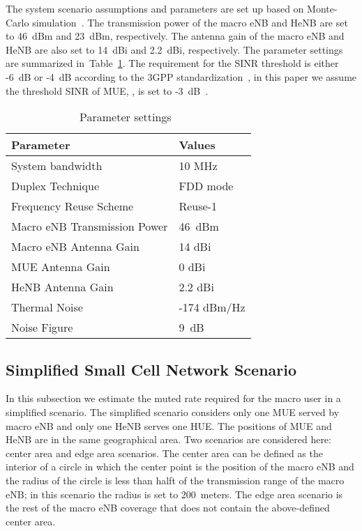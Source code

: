 \documentclass[paper]{ieice}
\begin{document}
The system scenario assumptions and parameters are set up based on Monte-Carlo simulation~\cite{TR-36942}. The transmission power of the  macro eNB and HeNB are set to 46~dBm and 23~dBm, respectively. The antenna gain of the macro eNB and HeNB are also set to 14~dBi and 2.2~dBi, respectively. The parameter settings are summarized in~Table~\ref{parameter}. The requirement for the SINR threshold is either -6~dB or -4~dB according to the 3GPP standardization~\cite{yang2011a}, in this paper we assume the threshold SINR of MUE, , is set to -3~dB~\cite{Kamel2012}.
\begin{table}[t]
\caption{Parameter settings~\cite{TR-36942}} \centering
\begin{tabular}{l l} \hline Parameter & Values \\ \hline System bandwidth                    & 10 MHz \\ Duplex Technique                    & FDD mode \\ Frequency Reuse Scheme              & Reuse-1 \\ Macro eNB Transmission Power             & 46~dBm\\ Macro eNB Antenna Gain                   & 14 dBi\\ MUE Antenna Gain                    & 0 dBi\\ HeNB Antenna Gain                   & 2.2 dBi\\ Thermal Noise                       & -174 dBm/Hz \\
Noise Figure                        & 9~dB  \\
\hline \end{tabular}
\label{parameter} \end{table}

\subsection{Simplified Small Cell Network Scenario}
\label{Eval-Simp}
In this subsection we estimate the muted rate required for the macro user in a simplified scenario. The simplified scenario considers only one MUE served by  macro eNB and only one HeNB serves one HUE. The positions of MUE and HeNB are in the same geographical area. Two scenarios are considered here: center area and edge area scenarios. The center area can be defined as the interior of a circle in which the center point is the position of the  macro eNB and the radius of the circle is less than halft of the transmission range of the  macro eNB; in this scenario the radius is set to 200~meters. The edge area scenario is the rest of the  macro eNB coverage that does not contain the above-defined center area.
\end{document}
